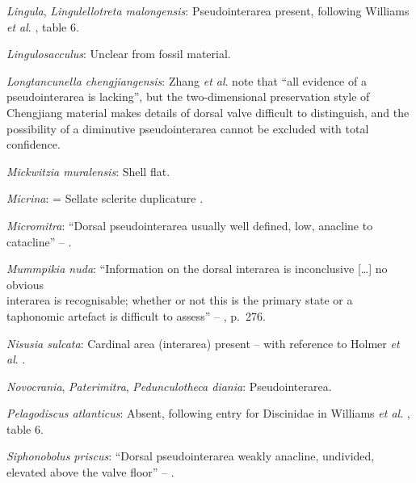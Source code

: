 \documentclass[openany]{book}
\theoremstyle{definition}
\theoremstyle{definition}
\theoremstyle{definition}
\theoremstyle{remark}
\begin{document}
\hypertarget{Lingula-coding-85}{}
\emph{Lingula}, \emph{Lingulellotreta malongensis}: Pseudointerarea
present, following Williams \emph{et al}.
\citeyearpar{Williams2000LinguliformeaCraniiformea}, table 6.

\hypertarget{Lingulosacculus-coding-85}{}
\emph{Lingulosacculus}: Unclear from fossil material.

\hypertarget{Longtancunella_chengjiangensis-coding-85}{}
\emph{Longtancunella chengjiangensis}: Zhang \emph{et al}.
\citeyearpar{Zhang2011Theexceptionally} note that ``all evidence of a
pseudointerarea is lacking'', but the two-dimensional preservation style
of Chengjiang material makes details of dorsal valve difficult to
distinguish, and the possibility of a diminutive pseudointerarea cannot
be excluded with total confidence.

\hypertarget{Mickwitzia_muralensis-coding-85}{}
\emph{Mickwitzia muralensis}: Shell flat.

\hypertarget{Micrina-coding-85}{}
\emph{Micrina}: = Sellate sclerite duplicature
\citep{Holmer2008TheEarly}.

\hypertarget{Micromitra-coding-85}{}
\emph{Micromitra}: ``Dorsal pseudointerarea usually well defined, low,
anacline to catacline'' --
\citet{Williams2000LinguliformeaCraniiformea}.

\hypertarget{Mummpikia_nuda-coding-85}{}
\emph{Mummpikia nuda}: ``Information on the dorsal interarea is
inconclusive {[}\ldots{}{]} no obvious\\
interarea is recognisable; whether or not this is the primary state or a
taphonomic artefact is difficult to assess'' --
\citet{Balthasar2008iMummpikia}, p.~276.

\hypertarget{Nisusia_sulcata-coding-85}{}
\emph{Nisusia sulcata}: Cardinal area (interarea) present -- with
reference to Holmer \emph{et al}.
\citeyearpar{Holmer2018Evolutionarysignificance}.

\hypertarget{Novocrania-coding-85}{}
\emph{Novocrania}, \emph{Paterimitra}, \emph{Pedunculotheca diania}:
Pseudointerarea.

\hypertarget{Pelagodiscus_atlanticus-coding-85}{}
\emph{Pelagodiscus atlanticus}: Absent, following entry for Discinidae
in Williams \emph{et al}.
\citeyearpar{Williams2000LinguliformeaCraniiformea}, table 6.

\hypertarget{Siphonobolus_priscus-coding-85}{}
\emph{Siphonobolus priscus}: ``Dorsal pseudointerarea weakly anacline,
undivided, elevated above the valve floor'' --
\citet{Popov2009Earlyontogeny}.
\end{document}
